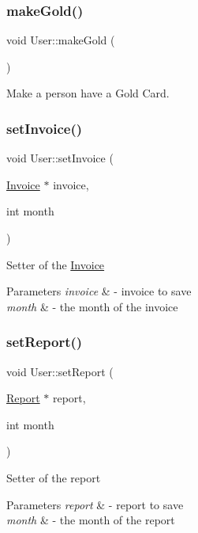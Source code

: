 \subsubsection{\texorpdfstring{make\+Gold()}{makeGold()}}
{\footnotesize\ttfamily void User\+::make\+Gold (\begin{DoxyParamCaption}{ }\end{DoxyParamCaption})}



Make a person have a Gold Card. 

\mbox{\label{class_user_ad0432b83c7379ca57ed782d2929f3b8a}} 
\subsubsection{\texorpdfstring{set\+Invoice()}{setInvoice()}}
{\footnotesize\ttfamily void User\+::set\+Invoice (\begin{DoxyParamCaption}\item[{\mbox{\hyperlink{class_invoice}{Invoice}} $\ast$}]{invoice,  }\item[{int}]{month }\end{DoxyParamCaption})}

Setter of the \mbox{\hyperlink{class_invoice}{Invoice}} 
\begin{DoxyParams}{Parameters}
{\em invoice} & -\/ invoice to save \\
\hline
{\em month} & -\/ the month of the invoice \\
\hline
\end{DoxyParams}
\mbox{\label{class_user_a0cdc359989bc67c3a135737cf1232a49}} 
\subsubsection{\texorpdfstring{set\+Report()}{setReport()}}
{\footnotesize\ttfamily void User\+::set\+Report (\begin{DoxyParamCaption}\item[{\mbox{\hyperlink{class_report}{Report}} $\ast$}]{report,  }\item[{int}]{month }\end{DoxyParamCaption})}

Setter of the report 
\begin{DoxyParams}{Parameters}
{\em report} & -\/ report to save \\
\hline
{\em month} & -\/ the month of the report \\
\hline
\end{DoxyParams}
\mbox{\label{class_user_ab0e9dba3828977748ad6316eb346a854}} 
